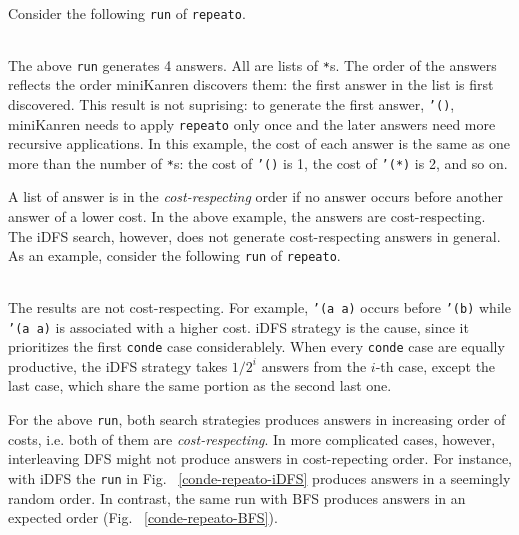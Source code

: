 \documentclass[format=acmlarge, review=true, authordraft=true]{acmart}
\begin{document}
Consider the following \texttt{run} of \texttt{repeato}.
\begin{center}
  \begin{tabular}{c}
  
   \end{tabular}
\end{center}

The above \texttt{run} generates 4 answers. All are lists of \texttt{*}s.
The order of the answers reflects the order miniKanren discovers them:
the first answer in the list is first discovered. This result is not suprising:
to generate the first answer, \texttt{'()}, miniKanren needs to apply
\texttt{repeato} only once and the later answers need more recursive
applications. In this example, the cost of each answer is the same as
one more than the number of \texttt{*}s: the cost of \texttt{'()} is 1,
the cost of \texttt{'(*)} is 2, and so on.

A list of answer is in the \emph{cost-respecting} order if no answer occurs
before another answer of a lower cost. In the above example, the answers are
cost-respecting. The iDFS search, however, does not generate cost-respecting
answers in general. As an example, consider the following \texttt{run} of
\texttt{repeato}.
\begin{center}
  \begin{tabular}{c}
   
   \end{tabular}
\end{center}

The results are not cost-respecting. For example, \texttt{'(a a)} occurs before
\texttt{'(b)} while \texttt{'(a a)} is associated with a higher cost. 
iDFS strategy is the cause, since it prioritizes the first \texttt{conde} case
considerablely. When every \texttt{conde} case are equally productive, the iDFS
strategy takes $1/2^{i}$ answers from the $i$-th case, except the last case,
which share the same portion as the second last one.


For the above \texttt{run}, both search strategies produces answers in 
increasing order of costs, i.e. both of them are \emph{cost-respecting}. In 
more complicated cases, however, interleaving DFS might not produce answers in 
cost-repecting order. For instance, with iDFS the \texttt{run} in Fig.~
\ref{conde-repeato-iDFS} produces answers in a seemingly random order. In 
contrast, the same run with BFS produces answers in an expected order (Fig.~
\ref{conde-repeato-BFS}).
\end{document}
